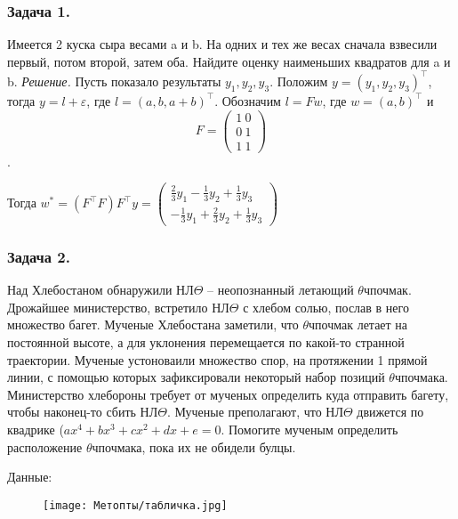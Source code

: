 \subsubsection*{Задача 1.} 
Имеется 2 куска сыра весами a и b. На одних и тех же весах сначала взвесили первый, потом второй, затем оба. Найдите оценку наименьших квадратов для a и b.
\noindent\textit{Решение.} Пусть показало результаты $y_1, y_2, y_3$. Положим $y = (y_1, y_2, y_3)^\top$, тогда $y = l + \varepsilon$, где $l = (a, b, a + b)^\top$. Обозначим $l = Fw$, где $w = (a, b)^\top$ и 
$$F = \begin{pmatrix}
    1 \ 0 \\
    0 \ 1 \\
    1 \ 1
\end{pmatrix}$$.

Тогда $w^* = (F^\top F) F^\top y = \begin{pmatrix}
    \frac{2}{3}y_1 - \frac{1}{3}y_2 + \frac{1}{3}y_3 \\
    -\frac{1}{3}y_1 + \frac{2}{3}y_2 + \frac{1}{3}y_3
\end{pmatrix}$

\subsubsection*{Задача 2.} Над Хлебостаном обнаружили НЛ$\Theta$ -- неопознанный летающий $\theta$чпочмак. Дрожайшее министерство, встретило НЛ$\Theta$ с хлебом солью, послав в него множество багет.
Мученые Хлебостана заметили, что $\theta$чпочмак летает на постоянной высоте, а для уклонения перемещается по какой-то странной траектории. Мученые устоноваили множество спор, на протяжении 1 прямой линии, с помощью которых зафиксировали некоторый набор позиций $\theta$чпочмака. Министерство хлебороны требует от мученых определить куда отправить багету, чтобы наконец-то сбить НЛ$\Theta$. Мученые преполагают, что НЛ$\Theta$ движется по квадрике ($ax^4 + bx^3 + cx^2 + dx + e = 0$. Помогите мученым определить расположение $\theta$чпочмака, пока их не обидели булцы.

Данные:
\begin{figure}[h]
    \centering
    \texttt{[image: Метопты/табличка.jpg]}
\end{figure}
 
